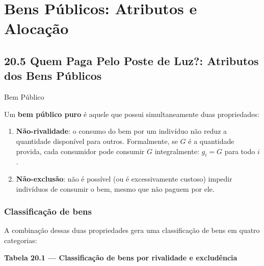 \documentclass[11pt,twoside,openright]{book}
\begin{document}
\chapter{Bens Públicos: Atributos e
Alocação}\label{bens-puxfablicos-atributos-e-alocauxe7uxe3o}

\section{20.5 Quem Paga Pelo Poste de Luz?: Atributos dos Bens
Públicos}\label{205}

\begin{definitionbox}{Bem Público}

Um \textbf{bem público puro} é aquele que possui simultaneamente duas
propriedades:

\begin{enumerate}
\def\labelenumi{\arabic{enumi}.}
\item
  \textbf{Não-rivalidade}: o consumo do bem por um indivíduo não reduz a
  quantidade disponível para outros. Formalmente, se \(G\) é a
  quantidade provida, cada consumidor pode consumir \(G\) integralmente:
  \(g_i = G\) para todo \(i\).
\item
  \textbf{Não-exclusão}: não é possível (ou é excessivamente custoso)
  impedir indivíduos de consumir o bem, mesmo que não paguem por ele.
\end{enumerate}

\end{definitionbox}

\subsection{Classificação de bens}\label{classificauxe7uxe3o-de-bens}

A combinação dessas duas propriedades gera uma classificação de bens em
quatro categorias:

\textbf{Tabela 20.1 --- Classificação de bens por rivalidade e
excludência}
\end{document}
